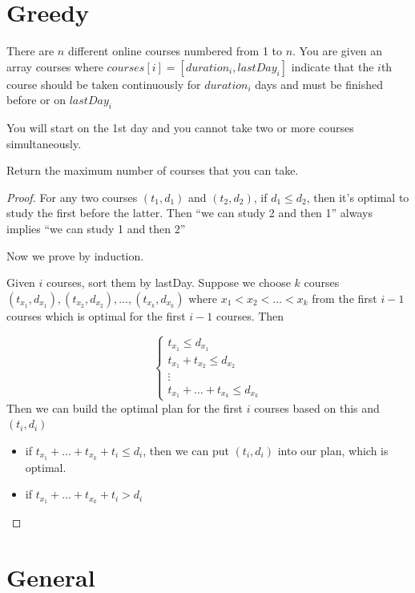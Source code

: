 \documentclass[11pt]{article}
\begin{document}
\section{Greedy}
\label{sec:org964a24b}
\begin{problem}
There are \(n\) different online courses numbered from 1 to \(n\). You are given an array courses where
\(courses[i]=[duration_i,lastDay_i]\) indicate that the \(i\)th course should be taken continuously for
\(duration_i\) days and must be finished before or on \(lastDay_i\)

You will start on the 1st day and you cannot take two or more courses simultaneously.

Return the maximum number of courses that you can take.
\end{problem}

\begin{proof}
For any two courses \((t_1,d_1)\) and \((t_2,d_2)\), if \(d_1\le d_2\), then it's optimal to study the
first before the latter. Then ``we can study 2 and then 1'' always implies ``we can study 1 and
then 2''

Now we prove by induction.

Given \(i\) courses, sort them by lastDay. Suppose we choose \(k\) courses \((t_{x_1},d_{x_1}),(t_{x_2},d_{x_2}),\dots,(t_{x_k},d_{x_k})\) where \(x_1<x_2<\dots<x_k\) from
the first \(i-1\) courses which is optimal for the first \(i-1\) courses. Then

\begin{equation*}
\begin{cases}
t_{x_1}\le d_{x_1}\\
t_{x_1}+t_{x_2}\le d_{x_2}\\
\vdots\\
t_{x_1}+\dots+t_{x_k}\le d_{x_k}
\end{cases}
\end{equation*}
Then we can build the optimal plan for the first \(i\) courses based on this and \((t_i,d_i)\)
\begin{itemize}
\item if \(t_{x_1}+\dots+t_{x_k}+t_i\le d_i\), then we can put \((t_i,d_i)\) into our plan, which is optimal.
\item if \(t_{x_1}+\dots+t_{x_k}+t_i>d_i\)
\end{itemize}
\end{proof}

\section{General}
\label{sec:org258c883}
\end{document}
